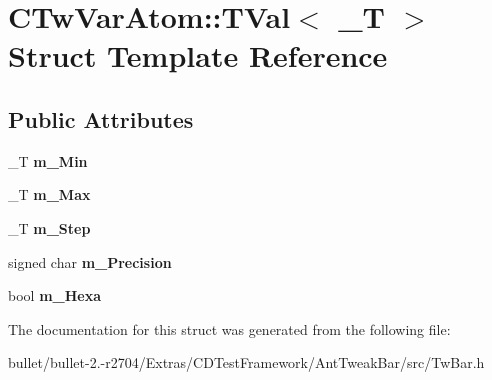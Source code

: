 \hypertarget{struct_c_tw_var_atom_1_1_t_val}{\section{C\+Tw\+Var\+Atom\+:\+:T\+Val$<$ \+\_\+\+T $>$ Struct Template Reference}
\label{struct_c_tw_var_atom_1_1_t_val}
}
\subsection*{Public Attributes}
\begin{DoxyCompactItemize}
\item 
\hypertarget{struct_c_tw_var_atom_1_1_t_val_a8b65facc57d6ad387d06bf551fb865ca}{\+\_\+\+T {\bfseries m\+\_\+\+Min}}\label{struct_c_tw_var_atom_1_1_t_val_a8b65facc57d6ad387d06bf551fb865ca}

\item 
\hypertarget{struct_c_tw_var_atom_1_1_t_val_a8dc25876212c6db61f3711d8b1eef406}{\+\_\+\+T {\bfseries m\+\_\+\+Max}}\label{struct_c_tw_var_atom_1_1_t_val_a8dc25876212c6db61f3711d8b1eef406}

\item 
\hypertarget{struct_c_tw_var_atom_1_1_t_val_a984228b59aca3d026ee3dabe644a0687}{\+\_\+\+T {\bfseries m\+\_\+\+Step}}\label{struct_c_tw_var_atom_1_1_t_val_a984228b59aca3d026ee3dabe644a0687}

\item 
\hypertarget{struct_c_tw_var_atom_1_1_t_val_abefe63649b7c5d14818c9135190b0908}{signed char {\bfseries m\+\_\+\+Precision}}\label{struct_c_tw_var_atom_1_1_t_val_abefe63649b7c5d14818c9135190b0908}

\item 
\hypertarget{struct_c_tw_var_atom_1_1_t_val_a7986ecbf4899fddd30f14fe534407b36}{bool {\bfseries m\+\_\+\+Hexa}}\label{struct_c_tw_var_atom_1_1_t_val_a7986ecbf4899fddd30f14fe534407b36}

\end{DoxyCompactItemize}


The documentation for this struct was generated from the following file\+:\begin{DoxyCompactItemize}
\item 
bullet/bullet-\/2.-\/r2704/\+Extras/\+C\+D\+Test\+Framework/\+Ant\+Tweak\+Bar/src/Tw\+Bar.\+h\end{DoxyCompactItemize}
